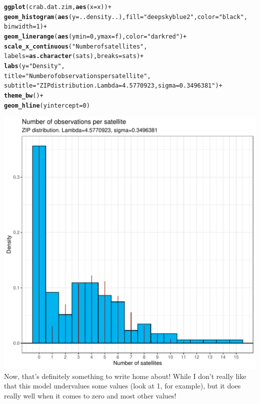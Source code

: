 \documentclass{article}\usepackage[]{graphicx}\usepackage[]{color}
\makeatletter
\def\maxwidth{ %
  \ifdim\Gin@nat@width>\linewidth
    \linewidth
  \else
    \Gin@nat@width
  \fi
}
\newcommand{\hlnum}[1]{\textcolor[rgb]{0.686,0.059,0.569}{#1}}%
\newcommand{\hlstr}[1]{\textcolor[rgb]{0.192,0.494,0.8}{#1}}%
\newcommand{\hlopt}[1]{\textcolor[rgb]{0,0,0}{#1}}%
\newcommand{\hlstd}[1]{\textcolor[rgb]{0.345,0.345,0.345}{#1}}%
\newcommand{\hlkwc}[1]{\textcolor[rgb]{0.333,0.667,0.333}{#1}}%
\newcommand{\hlkwd}[1]{\textcolor[rgb]{0.737,0.353,0.396}{\textbf{#1}}}%
\newenvironment{kframe}{%
 \def\at@end@of@kframe{}%
 \ifinner\ifhmode%
  \def\at@end@of@kframe{\end{minipage}}%
  \begin{minipage}{\columnwidth}%
 \fi\fi%
 \def\FrameCommand##1{\hskip\@totalleftmargin \hskip-\fboxsep
 \colorbox{shadecolor}{##1}\hskip-\fboxsep
     \hskip-\linewidth \hskip-\@totalleftmargin \hskip\columnwidth}%
 \MakeFramed {\advance\hsize-\width
   \@totalleftmargin\z@ \linewidth\hsize
   \@setminipage}}%
 {\par\unskip\endMakeFramed%
 \at@end@of@kframe}
\newenvironment{knitrout}{}{} %
\makeatother
\begin{document}
\begin{enumerate}
\begin{enumerate}
\begin{knitrout}
\begin{kframe}
\begin{alltt}
\hlkwd{ggplot}\hlstd{(crab.dat.zim,} \hlkwd{aes}\hlstd{(}\hlkwc{x}\hlstd{=x))}\hlopt{+}
  \hlkwd{geom_histogram}\hlstd{(}\hlkwd{aes}\hlstd{(}\hlkwc{y}\hlstd{=..density..),} \hlkwc{fill}\hlstd{=}\hlstr{"deepskyblue2"}\hlstd{,} \hlkwc{color}\hlstd{=}\hlstr{"black"}\hlstd{,}
                 \hlkwc{binwidth}\hlstd{=}\hlnum{1}\hlstd{)}\hlopt{+}
  \hlkwd{geom_linerange}\hlstd{(}\hlkwd{aes}\hlstd{(}\hlkwc{ymin}\hlstd{=}\hlnum{0}\hlstd{,} \hlkwc{ymax}\hlstd{=f),} \hlkwc{color}\hlstd{=}\hlstr{"dark red"}\hlstd{)}\hlopt{+}
  \hlkwd{scale_x_continuous}\hlstd{(}\hlstr{"Number of satellites"}\hlstd{,}
                     \hlkwc{labels} \hlstd{=} \hlkwd{as.character}\hlstd{(sats),} \hlkwc{breaks} \hlstd{= sats)}\hlopt{+}
  \hlkwd{labs}\hlstd{(}\hlkwc{y}\hlstd{=}\hlstr{"Density"}\hlstd{,}
       \hlkwc{title}\hlstd{=}\hlstr{"Number of observations per satellite"}\hlstd{,}
       \hlkwc{subtitle}\hlstd{=}\hlstr{"ZIP distribution. Lambda=4.5770923, sigma=0.3496381"}\hlstd{)} \hlopt{+}
  \hlkwd{theme_bw}\hlstd{()}\hlopt{+}
  \hlkwd{geom_hline}\hlstd{(}\hlkwc{yintercept}\hlstd{=}\hlnum{0}\hlstd{)}
\end{alltt}
\end{kframe}
\includegraphics[width=\maxwidth]{figure/unnamed-chunk-6-1} 
\end{knitrout}
Now, that's definitely something to write home about! While I don't really like that this model undervalues some values (look at 1, for example), but it does really well when it comes to zero and most other values! \\

\end{enumerate}
\end{enumerate}
\end{document}
